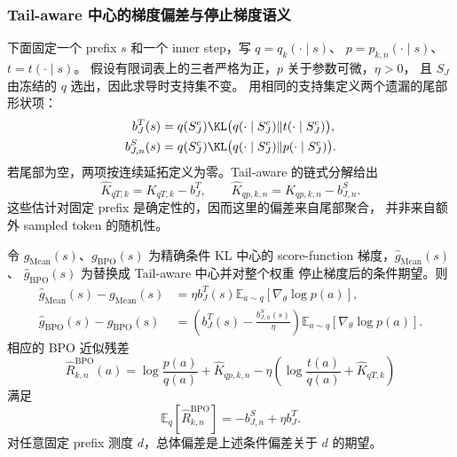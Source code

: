 \subsubsection*{Tail-aware 中心的梯度偏差与停止梯度语义}

下面固定一个 prefix $s$ 和一个 inner step，写 $q=q_k(\cdot\mid s)$、 $p=p_{k,n}(\cdot\mid s)$、$t=t(\cdot\mid s)$。 假设有限词表上的三者严格为正，$p$ 关于参数可微，$\eta>0$， 且 $S_J$ 由冻结的 $q$ 选出，因此求导时支持集不变。 用相同的支持集定义两个遗漏的尾部形状项：
\begin{align}
 b_J^T(s)&=q(S_J^c)\KL\bigl(q(\cdot\mid S_J^c)\Vert t(\cdot\mid S_J^c)\bigr),\\
 b_{J,n}^S(s)&=q(S_J^c)\KL\bigl(q(\cdot\mid S_J^c)\Vert p(\cdot\mid S_J^c)\bigr).
\end{align}
若尾部为空，两项按连续延拓定义为零。Tail-aware 的链式分解给出
\begin{equation}
 \widehat K_{qT,k}=K_{qT,k}-b_J^T,
 \qquad
 \widehat K_{qp,k,n}=K_{qp,k,n}-b_{J,n}^S.
\end{equation}
这些估计对固定 prefix 是确定性的，因而这里的偏差来自尾部聚合， 并非来自额外 sampled token 的随机性。

\begin{theorem}
\label{thm:ch2-ta-center-gradient-bias}
令 $g_{\mathrm{Mean}}(s)$、$g_{\mathrm{BPO}}(s)$ 为精确条件 KL 中心的 score-function 梯度，$\widehat g_{\mathrm{Mean}}(s)$、 $\widehat g_{\mathrm{BPO}}(s)$ 为替换成 Tail-aware 中心并对整个权重 停止梯度后的条件期望。则
\begin{align}
 \widehat g_{\mathrm{Mean}}(s)-g_{\mathrm{Mean}}(s)
 &=\eta b_J^T(s)\mathbb E_{a\sim q}[\nabla_\theta\log p(a)],\\
 \widehat g_{\mathrm{BPO}}(s)-g_{\mathrm{BPO}}(s)
 &=\left(b_J^T(s)-\frac{b_{J,n}^S(s)}{\eta}\right)
   \mathbb E_{a\sim q}[\nabla_\theta\log p(a)].
\end{align}
相应的 BPO 近似残差
\begin{equation}
 \widehat R_{k,n}^{\mathrm{BPO}}(a)
 =\log\frac{p(a)}{q(a)}+\widehat K_{qp,k,n}
 -\eta\left(\log\frac{t(a)}{q(a)}+\widehat K_{qT,k}\right)
\end{equation}
满足
\begin{equation}
 \mathbb E_q[\widehat R_{k,n}^{\mathrm{BPO}}]=-b_{J,n}^S+\eta b_J^T.
\end{equation}
对任意固定 prefix 测度 $d$，总体偏差是上述条件偏差关于 $d$ 的期望。
\end{theorem}

